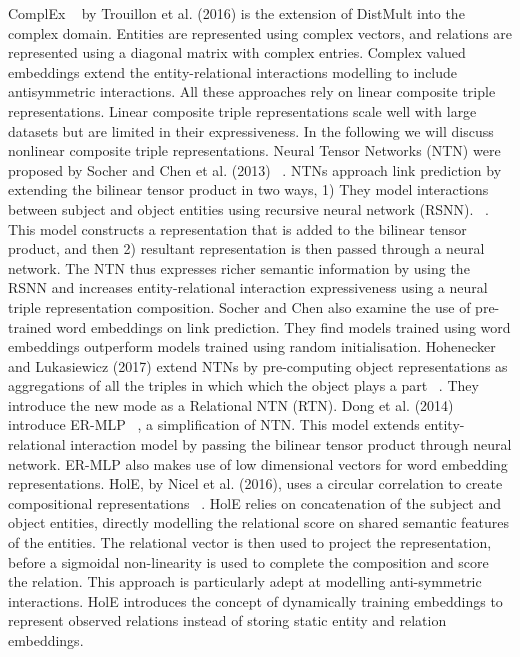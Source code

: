 ComplEx ~\citep{trouillon2016complex} by Trouillon et al. (2016) is the extension of DistMult into the complex domain. Entities are represented using complex vectors, and relations are represented using a diagonal matrix with complex entries. Complex valued embeddings extend the entity-relational interactions modelling to include antisymmetric interactions. \newline
All these approaches rely on linear composite triple representations. Linear composite triple representations scale well with large datasets but are limited in their expressiveness. In the following we will discuss nonlinear composite triple representations. \newline
Neural Tensor Networks (NTN) were proposed by Socher and Chen et al. (2013) ~\citep{NIPS2013_5028}. NTNs approach link prediction by extending the bilinear tensor product in two ways, 1) They model interactions between subject and object entities using recursive neural network (RSNN). ~\citep{socher2012semantic}. This model constructs a representation that is added to the bilinear tensor product, and then 2) resultant representation is then passed through a neural network. The NTN thus expresses richer semantic information by using the RSNN and increases entity-relational interaction expressiveness using a neural triple representation composition. Socher and Chen also examine the use of pre-trained word embeddings on link prediction. They find models trained using word embeddings outperform models trained using random initialisation. \newline
Hohenecker and Lukasiewicz (2017) extend NTNs by pre-computing object representations as aggregations of all the triples in which which the object plays a part ~\citep{hohenecker2017deep}. They introduce the new mode as a Relational NTN (RTN). Dong et al. (2014) introduce ER-MLP ~\citep{dong2014knowledge, nickel2015review}, a simplification of NTN. This model extends entity-relational interaction model by passing the bilinear tensor product through neural network. ER-MLP also makes use of low dimensional vectors for word embedding representations. \newline 
HolE, by Nicel et al. (2016), uses a  circular correlation to create compositional representations ~\citep{nickel2016holographic}. HolE relies on concatenation of the subject and object entities, directly modelling the relational score on shared semantic features of the entities. The relational vector is then used to project the representation, before a sigmoidal non-linearity is used to complete the composition and score the relation. This approach is particularly adept at modelling anti-symmetric interactions. HolE introduces the concept of dynamically training embeddings to represent observed relations instead of storing static entity and relation embeddings. \newline
